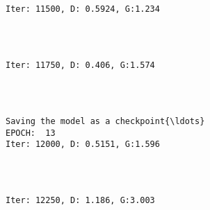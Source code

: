 \documentclass[11pt]{article}
\begin{document}
    \begin{center}
    \end{center}
    { \hspace*{\fill} \\}
    
    \begin{Verbatim}[commandchars=\\\{\}]

Iter: 11500, D: 0.5924, G:1.234
    \end{Verbatim}

    \begin{center}
    \end{center}
    { \hspace*{\fill} \\}
    
    \begin{Verbatim}[commandchars=\\\{\}]

Iter: 11750, D: 0.406, G:1.574
    \end{Verbatim}

    \begin{center}
    \end{center}
    { \hspace*{\fill} \\}
    
    \begin{Verbatim}[commandchars=\\\{\}]

Saving the model as a checkpoint{\ldots}
EPOCH:  13
Iter: 12000, D: 0.5151, G:1.596
    \end{Verbatim}

    \begin{center}
    \end{center}
    { \hspace*{\fill} \\}
    
    \begin{Verbatim}[commandchars=\\\{\}]

Iter: 12250, D: 1.186, G:3.003
    \end{Verbatim}
\end{document}
